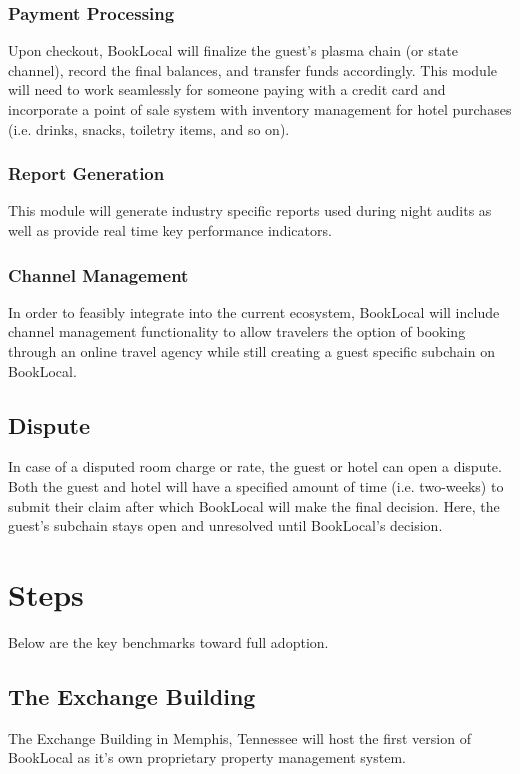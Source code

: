 \documentclass{article}
\begin{document}
\subsubsection{Payment Processing}
Upon checkout, BookLocal will finalize the guest's plasma chain (or state channel), record the final balances, and transfer funds accordingly. This module will need to work seamlessly for someone paying with a credit card and incorporate a point of sale system with inventory management for hotel purchases (i.e. drinks, snacks, toiletry items, and so on).

\subsubsection{Report Generation}
This module will generate industry specific reports used during night audits as well as provide real time key performance indicators.  

\subsubsection{Channel Management}
In order to feasibly integrate into the current ecosystem, BookLocal will include channel management functionality to allow travelers the option of booking through an online travel agency while still creating a guest specific subchain on BookLocal.   

\subsection{Dispute}
In case of a disputed room charge or rate, the guest or hotel can open a dispute. Both the guest and hotel will have a specified amount of time (i.e. two-weeks) to submit their claim after which BookLocal will make the final decision. Here, the guest's subchain stays open and unresolved until BookLocal's decision.


\newpage
\section{Steps}
Below are the key benchmarks toward full adoption. 

\subsection{The Exchange Building}
The Exchange Building in Memphis, Tennessee will host the first version of BookLocal as it's own proprietary property management system. 
\end{document}

